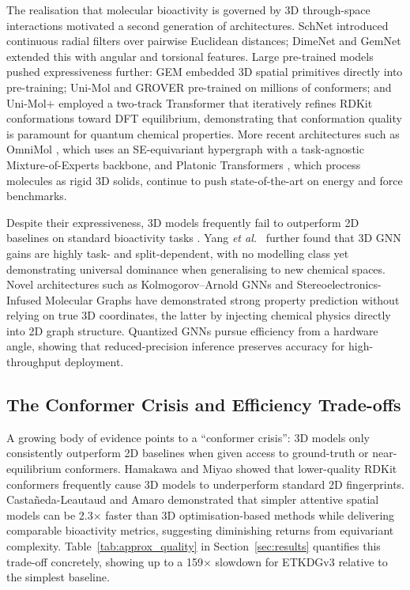 \documentclass[pdflatex,sn-vancouver-num]{sn-jnl}%
\theoremstyle{thmstyleone}%
\theoremstyle{thmstyletwo}%
\theoremstyle{thmstylethree}%
\begin{document}
The realisation that molecular bioactivity is governed by 3D
through-space interactions motivated a second generation of architectures.
SchNet \cite{schutt2018schnet} introduced continuous radial filters over
pairwise Euclidean distances; DimeNet \cite{klicpera2020dimenet} and
GemNet \cite{gasteiger2021gemnet} extended this with angular and torsional features.  Large
pre-trained models pushed expressiveness further: GEM \cite{fang2022gem}
embedded 3D spatial primitives directly into pre-training; Uni-Mol
\cite{zhou2023unimol} and GROVER \cite{rong2020grover} pre-trained on
millions of conformers; and Uni-Mol$+$ \cite{lu2024unimolplus} employed
a two-track Transformer that iteratively refines RDKit conformations
toward DFT equilibrium, demonstrating that conformation quality is
paramount for quantum chemical properties.  More recent architectures
such as OmniMol \cite{wang2025omnimol}, which uses an SE-equivariant
hypergraph with a task-agnostic Mixture-of-Experts backbone, and
Platonic Transformers \cite{islam2025platonictransformerssolidchoice},
which process molecules as rigid 3D solids, continue to push
state-of-the-art on energy and force benchmarks.

Despite their expressiveness, 3D models frequently fail to outperform 2D
baselines on standard bioactivity tasks \cite{praski2025benchmarking}.
Yang \emph{et al.}\ \cite{yang2019dmpnn} further found that 3D GNN
gains are highly task- and split-dependent, with no modelling class
yet demonstrating universal dominance when generalising to new chemical
spaces.  Novel architectures such as
Kolmogorov--Arnold GNNs \cite{kangnn2025} and Stereoelectronics-Infused
Molecular Graphs \cite{Boiko_2025} have demonstrated strong property
prediction without relying on true 3D coordinates, the latter by
injecting chemical physics directly into 2D graph structure.  Quantized
GNNs \cite{rasool2025quantized} pursue efficiency from a hardware angle,
showing that reduced-precision inference preserves accuracy for
high-throughput deployment.

\subsection{The Conformer Crisis and Efficiency Trade-offs}

A growing body of evidence points to a ``conformer crisis'': 3D models
only consistently outperform 2D baselines when given access to
ground-truth or near-equilibrium conformers.  Hamakawa and Miyao
\cite{hamakawa2025conformation} showed that lower-quality RDKit
conformers frequently cause 3D models to underperform standard 2D
fingerprints.  Castañeda-Leautaud and Amaro \cite{Castaneda_Leautaud_2025}
demonstrated that simpler attentive spatial models can be 2.3$\times$
faster than 3D optimisation-based methods while delivering comparable
bioactivity metrics, suggesting diminishing returns from equivariant
complexity.  Table~\ref{tab:approx_quality} in Section~\ref{sec:results}
quantifies this trade-off concretely, showing up to a 159$\times$
slowdown for ETKDGv3 relative to the simplest baseline.
\end{document}
